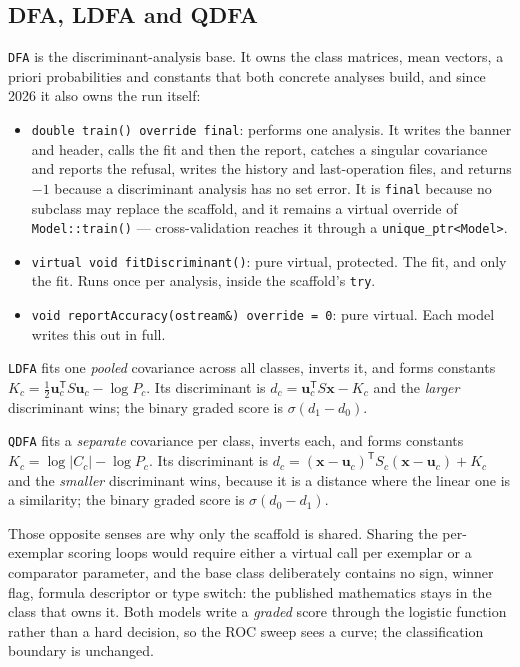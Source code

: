 \subsection{DFA, LDFA and QDFA}
\texttt{DFA} is the discriminant-analysis base.  It owns the class matrices,
mean vectors, a priori probabilities and constants that both concrete analyses
build, and since 2026 it also owns the run itself:

\begin{itemize}
\item \texttt{double train() override final}: performs one analysis.  It writes
      the banner and header, calls the fit and then the report, catches a
      singular covariance and reports the refusal, writes the history and
      last-operation files, and returns $-1$ because a discriminant analysis has
      no set error.  It is \texttt{final} because no subclass may replace the
      scaffold, and it remains a virtual override of \texttt{Model::train()} ---
      cross-validation reaches it through a \texttt{unique\_ptr<Model>}.
\item \texttt{virtual void fitDiscriminant()}: pure virtual, protected.  The
      fit, and only the fit.  Runs once per analysis, inside the scaffold's
      \texttt{try}.
\item \texttt{void reportAccuracy(ostream\&) override = 0}: pure virtual.  Each
      model writes this out in full.
\end{itemize}

\texttt{LDFA} fits one \emph{pooled} covariance across all classes, inverts it,
and forms constants $K_c = \frac{1}{2}\mathbf{u}_c^{\mathsf{T}} S
\mathbf{u}_c - \log P_c$.  Its discriminant is $d_c = \mathbf{u}_c^{\mathsf{T}}
S \mathbf{x} - K_c$ and the \emph{larger} discriminant wins; the binary graded
score is $\sigma(d_1 - d_0)$.

\texttt{QDFA} fits a \emph{separate} covariance per class, inverts each, and
forms constants $K_c = \log|C_c| - \log P_c$.  Its discriminant is $d_c =
(\mathbf{x}-\mathbf{u}_c)^{\mathsf{T}} S_c (\mathbf{x}-\mathbf{u}_c) + K_c$ and
the \emph{smaller} discriminant wins, because it is a distance where the linear
one is a similarity; the binary graded score is $\sigma(d_0 - d_1)$.

Those opposite senses are why only the scaffold is shared.  Sharing the
per-exemplar scoring loops would require either a virtual call per exemplar or a
comparator parameter, and the base class deliberately contains no sign, winner
flag, formula descriptor or type switch: the published mathematics stays in the
class that owns it.  Both models write a \emph{graded} score through the
logistic function rather than a hard decision, so the ROC sweep sees a curve;
the classification boundary is unchanged.

